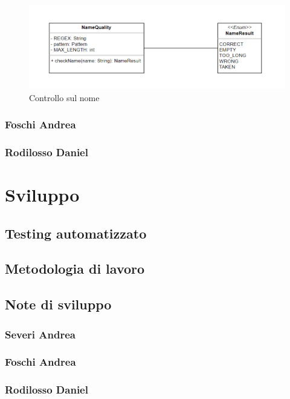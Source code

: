 \documentclass[a4paper,12pt]{report}
\begin{document}
\begin{figure}[H]
    \begin{center}
        \centering
        \includegraphics[width=\textwidth]{img/Severi/Name.png}
    \end{center}
    \caption{Controllo sul nome}
    \label{img:name}
\end{figure}

\subsection{Foschi Andrea}
\subsection{Rodilosso Daniel}

\chapter{Sviluppo}
\section{Testing automatizzato}
%
\section{Metodologia di lavoro}
%
\section{Note di sviluppo}
\subsection{Severi Andrea}
\subsection{Foschi Andrea}
\subsection{Rodilosso Daniel}
\end{document}

